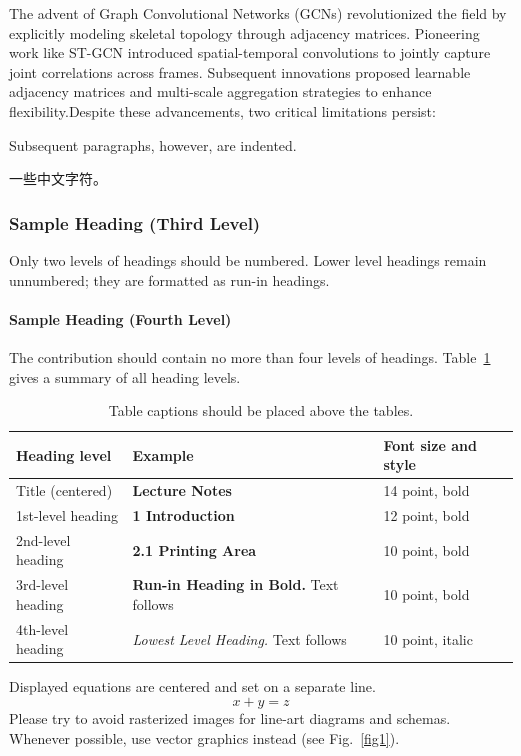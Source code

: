 \documentclass[runningheads]{llncs}
\begin{document}
The advent of Graph Convolutional Networks (GCNs) \cite{ref8} revolutionized the field by 
explicitly modeling skeletal topology through adjacency matrices. Pioneering 
work like ST-GCN \cite{ref7} introduced spatial-temporal convolutions to jointly 
capture joint correlations across frames. Subsequent innovations proposed 
learnable adjacency matrices \cite{ref9,ref10} and multi-scale aggregation 
strategies \cite{ref11} to enhance flexibility.Despite these advancements, 
two critical limitations persist:

Subsequent paragraphs, however, are indented.

一些中文字符。

\subsubsection{Sample Heading (Third Level)} Only two levels of
headings should be numbered. Lower level headings remain unnumbered;
they are formatted as run-in headings.

\paragraph{Sample Heading (Fourth Level)}
The contribution should contain no more than four levels of
headings. Table~\ref{tab1} gives a summary of all heading levels.

\begin{table}
\caption{Table captions should be placed above the
tables.}\label{tab1}
\begin{tabular}{|l|l|l|}
\hline
Heading level &  Example & Font size and style\\
\hline
Title (centered) &  {\Large\bfseries Lecture Notes} & 14 point, bold\\
1st-level heading &  {\large\bfseries 1 Introduction} & 12 point, bold\\
2nd-level heading & {\bfseries 2.1 Printing Area} & 10 point, bold\\
3rd-level heading & {\bfseries Run-in Heading in Bold.} Text follows & 10 point, bold\\
4th-level heading & {\itshape Lowest Level Heading.} Text follows & 10 point, italic\\
\hline
\end{tabular}
\end{table}


\noindent Displayed equations are centered and set on a separate
line.
\begin{equation}
x + y = z
\end{equation}
Please try to avoid rasterized images for line-art diagrams and
schemas. Whenever possible, use vector graphics instead (see
Fig.~\ref{fig1}).
\end{document}
